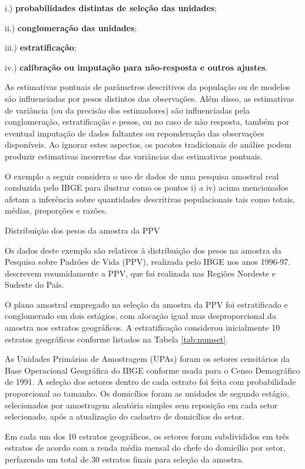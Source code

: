 \documentclass[]{book}
\theoremstyle{definition}
\theoremstyle{definition}
\theoremstyle{definition}
\theoremstyle{remark}
\let\BeginKnitrBlock\begin \let\EndKnitrBlock\end
\begin{document}
i.) \textbf{probabilidades distintas de seleção das unidades};

ii.) \textbf{conglomeração das unidades};

iii.) \textbf{estratificação};

iv.) \textbf{calibração ou imputação para não-resposta e outros
ajustes}.

As estimativas pontuais de parâmetros descritivos da população ou de
modelos são influenciadas por pesos distintos das observações. Além
disso, as estimativas de variância (ou da precisão dos estimadores) são
influenciadas pela conglomeração, estratificação e pesos, ou no caso de
não resposta, também por eventual imputação de dados faltantes ou
reponderação das observações disponíveis. Ao ignorar estes aspectos, os
pacotes tradicionais de análise podem produzir estimativas incorretas
das variâncias das estimativas pontuais.

O exemplo a seguir considera o uso de dados de uma pesquisa amostral
real conduzida pelo IBGE para ilustrar como os pontos i) a iv) acima
mencionados afetam a inferência sobre quantidades descritivas
populacionais tais como totais, médias, proporções e razões.

\BeginKnitrBlock{example}
\protect\hypertarget{exm:distppv}{}{\label{exm:distppv} }Distribuição dos
pesos da amostra da PPV
\EndKnitrBlock{example}

Os dados deste exemplo são relativos à distribuição dos pesos na amostra
da Pesquisa sobre Padrões de Vida (PPV), realizada pelo IBGE nos anos
1996-97. \citep{albieri} descrevem resumidamente a PPV, que foi
realizada nas Regiões Nordeste e Sudeste do País.

O plano amostral empregado na seleção da amostra da PPV foi
estratificado e conglomerado em dois estágios, com alocação igual mas
desproporcional da amostra nos estratos geográficos. A estratificação
considerou inicialmente 10 estratos geográficos conforme listados na
Tabela \ref{tab:numset}.

As Unidades Primárias de Amostragem (UPAs) foram os setores censitários
da Base Operacional Geográfica do IBGE conforme usada para o Censo
Demográfico de 1991. A seleção dos setores dentro de cada estrato foi
feita com probabilidade proporcional ao tamanho. Os domicílios foram as
unidades de segundo estágio, selecionados por amostragem aleatória
simples sem reposição em cada setor selecionado, após a atualização do
cadastro de domicílios do setor.

Em cada um dos 10 estratos geográficos, os setores foram subdivididos em
três estratos de acordo com a renda média mensal do chefe do domicílio
por setor, perfazendo um total de 30 estratos finais para seleção da
amostra.
\end{document}
